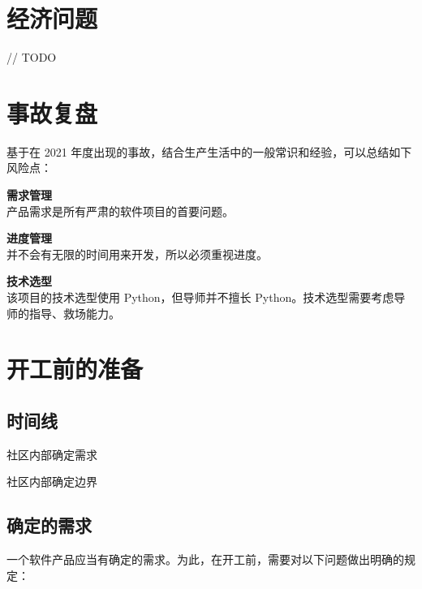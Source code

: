 \documentclass[a4paper,11pt]{article}
\begin{document}
\section{经济问题}

// TODO










\section{事故复盘}

基于在 2021 年度出现的事故，结合生产生活中的一般常识和经验，可以总结如下风险点：

\begin{compactitem}
	\item \textbf{需求管理}\\产品需求是所有严肃的软件项目的首要问题。
	\item \textbf{进度管理}\\并不会有无限的时间用来开发，所以必须重视进度。
	\item \textbf{技术选型}\\该项目的技术选型使用 Python，但导师并不擅长 Python。技术选型需要考虑导师的指导、救场能力。
\end{compactitem}









\section{开工前的准备}

\subsection{时间线}

\begin{compactitem}
    \item 社区内部确定需求
    \item 社区内部确定边界
\end{compactitem}


\subsection{确定的需求}

一个软件产品应当有确定的需求。为此，在开工前，需要对以下问题做出明确的规定：
\end{document}
